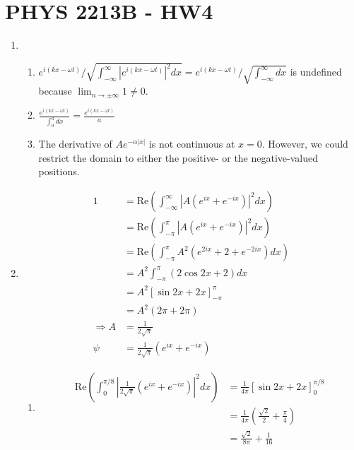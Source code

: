 \documentclass[a4paper,12pt]{article}
\begin{document}
\section*{PHYS 2213B - HW4}

\begin{enumerate}
    \item
        \begin{enumerate}
            \item
                $e^{i(kx - \omega t)} / \sqrt{\int_{-\infty}^\infty |e^{i(kx - \omega t)}|^2 dx} = e^{i(kx - \omega t)} / \sqrt{\int_{-\infty}^\infty dx}$ is undefined because $\lim_{n \to \pm \infty} 1 \neq 0$. 

            \item
                $\frac{e^{i(kx - \omega t)}}{\int_0^a dx} = \frac{e^{i(kx - \omega t)}}{a}$

            \item
                The derivative of $Ae^{-\alpha |x|}$ is not continuous at $x = 0$. However, we could restrict the domain to either the positive- or the negative-valued positions. 
        \end{enumerate}

    \item
        \begin{align*}
            1 &= \text{Re} \left( \int_{-\infty}^\infty |A(e^{ix} + e^{-ix})|^2 dx \right) \\
            &= \text{Re} \left( \int_{-\pi}^\pi |A(e^{ix} + e^{-ix})|^2 dx \right) \\
            &= \text{Re} \left( \int_{-\pi}^\pi A^2 \left( e^{2ix} + 2 + e^{-2ix} \right) dx \right) \\
            &= A^2 \int_{-\pi}^\pi \left( 2\cos2x + 2 \right) dx \\
            &= A^2 \left[ \sin2x + 2x \right]_{-\pi}^\pi \\
            &= A^2 (2\pi + 2\pi) \\
            \Rightarrow A &= \frac{1}{2 \sqrt{\pi}} \\
            \psi &= \frac{1}{2 \sqrt{\pi}} \left( e^{ix} + e^{-ix} \right)
        \end{align*}
        \begin{enumerate}
            \item
                \begin{align*}
                    \text{Re} \left( \int_0^{\pi / 8} \left| \frac{1}{2 \sqrt{\pi}} \left( e^{ix} + e^{-ix} \right) \right|^2 dx \right)
                    &= \frac{1}{4\pi} \left[ \sin2x + 2x \right]_0^{\pi / 8} \\
                    &= \frac{1}{4\pi} \left( \frac{\sqrt{2}}{2} + \frac{\pi}{4} \right) \\
                    &= \frac{\sqrt{2}}{8 \pi} + \frac{1}{16}
                \end{align*}


\end{enumerate}
\end{enumerate}
\end{document}
